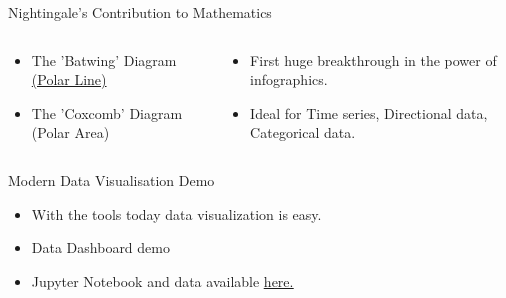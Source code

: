 \documentclass[10pt]{beamer}
\begin{document}
\begin{frame}{Nightingale's Contribution to Mathematics}



 \begin{columns}[T]
  \begin{column}{.50\textwidth}
    \begin{itemize}
      \item The 'Batwing' Diagram \href{run:./PolarArea.jpg}{(Polar Line)}
      \item The 'Coxcomb' Diagram (Polar Area)
    \end{itemize}
  \end{column}
  
  \begin{column}{.50\textwidth}
    \begin{itemize}
      \item First huge breakthrough in the power of infographics.
      \item Ideal for Time series, Directional data, Categorical data. 
    \end{itemize}
  \end{column}

\end{columns}
\end{frame}


\begin{frame}{Modern Data Visualisation Demo}
     \begin{itemize}
       \item With the tools today data visualization is easy.
       \item Data Dashboard demo
       \item Jupyter Notebook and data available \href{https://github.com/StefanoFochesatto/MATH-316}{\underline{here.}} 
     \end{itemize}

\end{frame}
\end{document}
